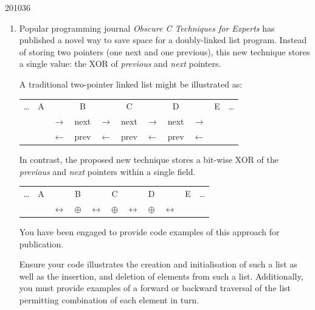\documentclass[10pt,\jkfside,a4paper]{article}
\begin{document}
\begin{examquestion}{2010}{3}{6}

\begin{enumerate}[label=(\alph*)]

\item Popular programming journal \textit{Obscure C Techniques for Experts}
has published a novel way to save space for a doubly-linked list program.
Instead of storing two pointers (one next and one previous), this new
technique stores a single value: the XOR of \textit{previous} and
\textit{next} pointers.

A traditional two-pointer linked list might be illustrated as:
\begin{table}[H]
\centering
\begin{tabular}{c c c c c c c c c c c}
\dots & A & & B & & C & & D & & E & \dots \\
& & $\longrightarrow$ & next & $\longrightarrow$ & next & $\longrightarrow $
 & next & $\longrightarrow $ \\
& & $\longleftarrow$ & prev & $\longleftarrow$ & prev & $\longleftarrow $
 & prev & $\longleftarrow $ \\
\end{tabular}
\end{table}

In contrast, the proposed new technique stores a bit-wise XOR of the
\textit{previous} and \textit{next} pointers within a single field.

\begin{table}[H]
\centering
\begin{tabular}{c c c c c c c c c c c}
\dots & A & & B & & C & & D & & E & \dots \\
& & $\longleftrightarrow $ & $\oplus$ & $\longleftrightarrow $ & $\oplus $ &
 $\longleftrightarrow $ & $\oplus $ & $\longleftrightarrow $ \\
\end{tabular}
\end{table}

You have been engaged to provide code examples of this approach for
publication.

Ensure your code illustrates the creation and initialisation of such a list
as well as the insertion, and deletion of elements from such a list.
Additionally, you must provide examples of a forward or backward traversal
of the list permitting combination of each element in turn.

\begin{lstlisting}[language=C]


\end{lstlisting}
\end{enumerate}
\end{examquestion}
\end{document}
